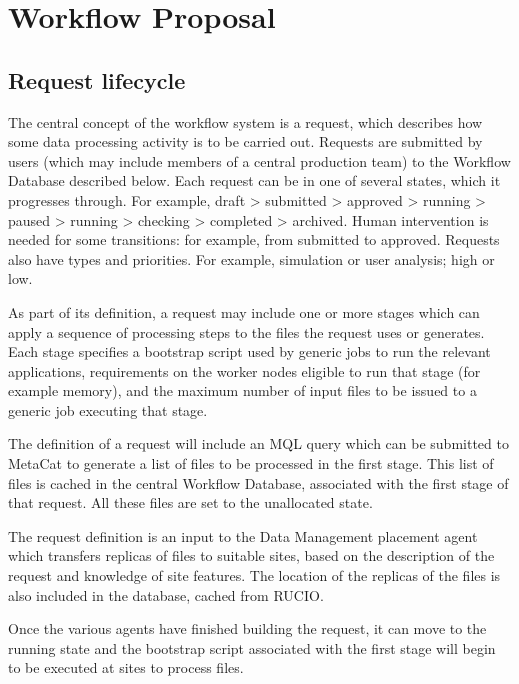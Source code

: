 \documentclass[../main-v1.tex]{subfiles}
\begin{document}
\section{Workflow Proposal} 
\subsection{Request lifecycle}
\label{sec:flow:lifecycle}

The central concept of the workflow system is a request, which describes how some data processing activity is to be carried out. Requests are submitted by users (which may include members of a central production team) to the Workflow Database described below. Each request can be in one of several states, which it progresses through. For example, draft > submitted > approved > running > paused > running > checking > completed > archived. Human intervention is needed for some transitions: for example, from submitted to approved. Requests also have types and priorities. For example, simulation or user analysis; high or low.

As part of its definition, a request may include one or more stages which can apply a sequence of processing steps to the files the request uses or generates. Each stage specifies a bootstrap script used by generic jobs to run the relevant applications, requirements on the worker nodes eligible to run that stage (for example memory), and the maximum number of input files to be issued to a generic job executing that stage.

The definition of a request will include an MQL query which can be submitted to MetaCat to generate a list of files to be processed in the first stage. This list of files is cached in the central Workflow Database, associated with the first stage of that request. All these files are set to the unallocated state. 

The request definition is an input to the Data Management placement agent which transfers replicas of files to suitable sites, based on the description of the request and knowledge of site features. The location of the replicas of the files is also included in the database, cached from RUCIO. 

Once the various agents have finished building the request, it can move to the running state and the bootstrap script associated with the first stage will begin to be executed at sites to process files.
\end{document}
